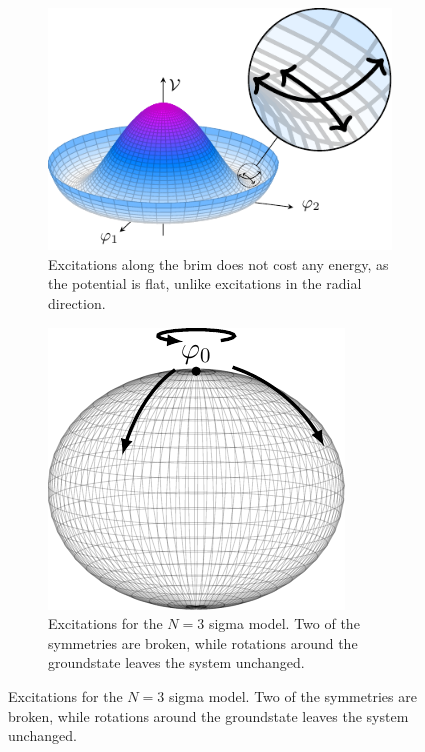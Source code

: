\begin{figure}[ht]
    \centering
    \begin{subfigure}{0.54\textwidth}
        \centering\captionsetup{width=.9\linewidth}
        \includegraphics[]{figurer/mexican_hat_zoom.pdf}
        \caption{Excitations along the brim does not cost any energy, as the potential is flat, unlike excitations in the radial direction.}
        \label{fig:Mexican hat zoom}
    \end{subfigure}
    \begin{subfigure}{0.45\textwidth}
        \centering\captionsetup{width=.9\linewidth}
        \includegraphics[]{figurer/sigma_ground_state.pdf}
        \caption{Excitations for the $N=3$ sigma model. Two of the symmetries are broken, while rotations around the groundstate leaves the system unchanged.}
        \label{fig:ground state manifold}
    \end{subfigure}
\end{figure}

